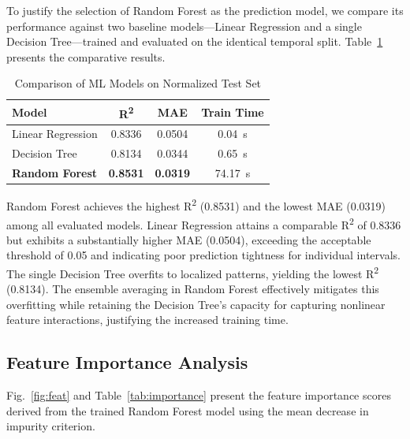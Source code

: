 \documentclass[conference]{IEEEtran}
\renewcommand{\small}{\fontsize{10}{14}\selectfont}
\begin{document}
To justify the selection of Random Forest as the prediction model, we compare its performance against two baseline models---Linear Regression and a single Decision Tree---trained and evaluated on the identical temporal split. Table~\ref{tab:baseline} presents the comparative results.

\begin{table}[H]
\caption{Comparison of ML Models on Normalized Test Set}
\begin{center}
\small
\begin{tabular}{|l|c|c|c|}
\hline
\textbf{Model} & \textbf{R\textsuperscript{2}} & \textbf{MAE} & \textbf{Train Time} \\
\hline
Linear Regression & 0.8336 & 0.0504 & 0.04~s \\
\hline
Decision Tree & 0.8134 & 0.0344 & 0.65~s \\
\hline
\textbf{Random Forest} & \textbf{0.8531} & \textbf{0.0319} & 74.17~s \\
\hline
\end{tabular}
\label{tab:baseline}
\end{center}
\end{table}

Random Forest achieves the highest R\textsuperscript{2} (0.8531) and the lowest MAE (0.0319) among all evaluated models. Linear Regression attains a comparable R\textsuperscript{2} of 0.8336 but exhibits a substantially higher MAE (0.0504), exceeding the acceptable threshold of 0.05 and indicating poor prediction tightness for individual intervals. The single Decision Tree overfits to localized patterns, yielding the lowest R\textsuperscript{2} (0.8134). The ensemble averaging in Random Forest effectively mitigates this overfitting while retaining the Decision Tree's capacity for capturing nonlinear feature interactions, justifying the increased training time.

\subsection{Feature Importance Analysis}

Fig.~\ref{fig:feat} and Table~\ref{tab:importance} present the feature importance scores derived from the trained Random Forest model using the mean decrease in impurity criterion.
\end{document}
